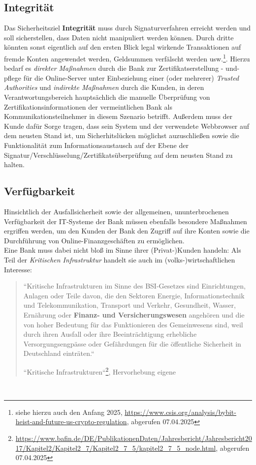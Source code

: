 \subsection{Integrität}
Das Sicherheitsziel \textbf{Integrität} muss durch Signaturverfahren erreicht werden und soll sicherstellen, dass Daten nicht manipuliert werden können. Durch dritte könnten sonst eigentlich auf den ersten Blick legal wirkende Transaktionen auf fremde Konten angewendet werden, Geldsummen verfälscht werden usw.\footnote{
siehe hierzu auch den  Anfang 2025, \url{https://www.csis.org/analysis/bybit-heist-and-future-us-crypto-regulation}, abgerufen 07.04.2025
}.
Hierzu bedarf es \textit{direkter Maßnahmen} durch die Bank zur Zertifikatserstellung - und-pflege für die Online-Server unter Einbeziehung einer (oder mehrerer)  \textit{Trusted Authorities} und \textit{indirekte Maßnahmen} durch die Kunden, in deren Verantwortungsbereich hauptsächlich die manuelle Überprüfung von Zertifikationsinformationen der vermeintlichen Bank als Kommunikationsteilnehmer in diesem Szenario betrifft. Außerdem muss der Kunde dafür Sorge tragen, dass sein System und der verwendete Webbrowser auf dem neusten Stand ist, um Sicherhitslücken möglichst auzuschließen sowie die Funktionalität zum Informationsaustausch auf der Ebene der Signatur/Verschlüsselung/Zertifikatsüberprüfung auf dem neusten Stand zu halten.

\subsection{Verfügbarkeit}
Hinsichtlich der Ausfallsicherheit sowie der allgemeinen, ununterbrochenen Verfügbarkeit der IT-Systeme der Bank müssen ebenfalls besondere Maßnahmen ergriffen werden, um den Kunden der Bank den Zugriff auf ihre Konten sowie die Durchführung von Online-Finanzgeschäften zu ermöglichen.\\
Eine Bank muss dabei nicht bloß im Sinne ihrer (Privat-)Kunden handeln: Als Teil der \textit{Kritischen Infrastruktur} handelt sie auch  im (volks-)wirtschaftlichen Interesse:

\blockquote[{``Kritische Infrastrukturen``\footnote{
\url{https://www.bafin.de/DE/PublikationenDaten/Jahresbericht/Jahresbericht2017/Kapitel2/Kapitel2_7/Kapitel2_7_5/kapitel2_7_5_node.html}, abgerufen 07.04.2025
}, Hervorhebung eigene}]{
``Kritische Infrastrukturen im Sinne des BSI-Gesetzes sind Einrichtungen, Anlagen oder Teile davon, die den Sektoren Energie, Informationstechnik und Telekommunikation, Transport und Verkehr, Gesundheit, Wasser, Ernährung oder \textbf{Finanz- und Versicherungswesen} angehören und die von hoher Bedeutung für das Funktionieren des Gemeinwesens sind, weil durch ihren Ausfall oder ihre Beeinträchtigung erhebliche Versorgungsengpässe oder Gefährdungen für die öffentliche Sicherheit in Deutschland einträten.``
}\\

